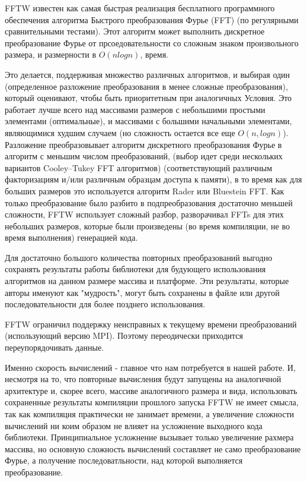 \documentclass[14pt]{extarticle}
\begin{document}
FFTW известен как самая быстрая реализация бесплатного программного обеспечения алгоритма Быстрого преобразования Фурье (FFT) (по регулярными сравнительными тестами). Этот алгоритм может выполнить дискретное преобразование Фурье от прсоедовательности со сложным знаком произвольного размера, и размерности в $O (n log n)$, время.

Это делается, поддерживая множество различных алгоритмов, и выбирая один (определенное разложение преобразования в менее сложные преобразования), который оценивают, чтобы быть приоритетным при аналогичных Условия. Это работает лучше всего над массивами размеров с небольшими простыми элементами (оптимальные), и массивами с большими начальными элементами, являющимися худшим случаем (но сложность остается все еще $O (n, log n)$). Разложение преобразовывает алгоритм дискретного преобразования Фурье в алгоритм с  меньшим числом преобразований, (выбор идет среди нескольких вариантов Cooley–Tukey FFT алгоритмов) (соответствующий различным факторизациям и/или различным образцам доступа к памяти), в то время как для больших размеров это используется алгоритм Rader или Bluestein FFT. Как только преобразование было разбито в подпреобразования достаточно меньшей сложности, FFTW использует сложный разбор, разворачивал FFTs для этих небольших размеров, которые были произведены (во время компиляции, не во время выполнения) генерацией кода.

Для достаточно большого количества повторных преобразований выгодно сохранять результаты работы библиотеки для будующего использования алгоритмов на данном размере массива и платформе. Эти результаты, которые авторы именуют как "мудрость", могут быть сохранены в файле или другой последовательности для более позднего использования.

FFTW ограничил поддержку неисправных к текущему времени преобразований (использующий версию MPI). Поэтому переодически приходится переупорядочивать данные.

Именно скорость вычислений - главное что нам потребуется в нашей работе. И, несмотря на то, что повторные вычисления будут запущены на аналогичной архитектуре и, скорее всего, массиве аналогичного размера и вида, использовать сохраненные результаты компиляции прошлого запуска FFTW не имеет смысла, так как компиляция практически не занимает времени, а увеличение сложности вычислений ни коим образом не влияет на усложнение выходного кода библиотеки. Принципиальное усложнение вызывает только увеличение рахмера массива, но основную сложность вычислений составляет не само преобразование Фурье, а получение последоватльности, над которой выполняется преобразование.
\end{document}

